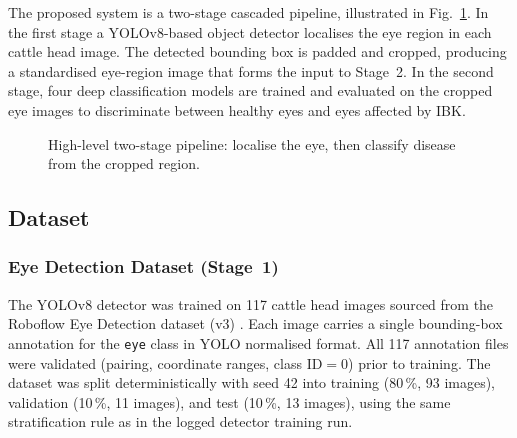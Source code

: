 \documentclass[10pt,journal,compsoc]{IEEEtran}
\begin{document}
The proposed system is a two-stage cascaded pipeline, illustrated in
Fig.~\ref{fig:pipeline}. In the first stage a YOLOv8-based object
detector localises the eye region in each cattle head image. The
detected bounding box is padded and cropped, producing a standardised
eye-region image that forms the input to Stage~2. In the second stage,
four deep classification models are trained and evaluated on the cropped
eye images to discriminate between healthy eyes and eyes affected by IBK.

\begin{figure}[t]
  \centering
  \caption{High-level two-stage pipeline: localise the eye, then classify
    disease from the cropped region.}
  \label{fig:pipeline}
\end{figure}

\subsection{Dataset}
\label{subsec:dataset}

\subsubsection{Eye Detection Dataset (Stage~1)}
The YOLOv8 detector was trained on 117 cattle head images sourced from
the Roboflow Eye Detection dataset (v3) \cite{roboflow_eye}. Each image
carries a single bounding-box annotation for the \texttt{eye} class in
YOLO normalised format. All 117 annotation files were validated (pairing,
coordinate ranges, class ID${}=0$) prior to training. The dataset was
split deterministically with seed 42 into training (80\,\%, 93 images),
validation (10\,\%, 11 images), and test (10\,\%, 13 images), using the
same stratification rule as in the logged detector training run.
\end{document}
